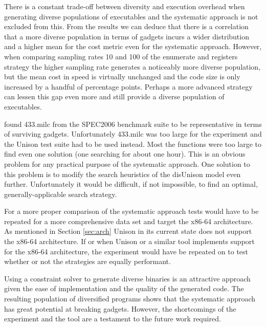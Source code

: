 There is a constant trade-off between diversity and execution overhead when generating
diverse populations of executables and the systematic approach is not excluded from this.
From the results we can deduce that there is a correlation that a more diverse population
in terms of gadgets incurs a wider distribution and a higher mean for the cost metric even
for the systematic approach. However, when comparing sampling rates 10 and 100 of the
enumerate and registers strategy the higher sampling rate generates a noticeably more
diverse population, but the mean cost in speed is virtually unchanged and the code size is
only increased by a handful of percentage points. Perhaps a more advanced strategy can
lessen this gap even more and still provide a diverse population of executables.

\textcite{large-scale-automated} found 433.milc from the SPEC2006 benchmark suite to be
representative in terms of surviving gadgets. Unfortunately 433.milc was too large for the
experiment and the Unison test suite had to be used instead. Most the functions were too
large to find even one solution (one searching for about one hour). This is an obvious
problem for any practical purpose of the systematic approach. One solution to this problem
is to modify the search heuristics of the disUnison model even further. Unfortunately it
would be difficult, if not impossible, to find an optimal, generally-applicable search
strategy.

For a more proper comparison of the systematic approach tests would have to be repeated for
a more comprehensive data set and target the x86-64 architecture. As mentioned in Section
\ref{sec:arch} Unison in its current state does not support the x86-64 architecture. If or
when Unison or a similar tool implements support for the x86-64 architecture, the
experiment would have be repeated on to test whether or not the strategies are equally
performant.

Using a constraint solver to generate diverse binaries is an attractive approach given
the ease of implementation and the quality of the generated code. The resulting population
of diversified programs shows that the systematic approach has great potential at breaking
gadgets. However, the shortcomings of the experiment and the tool are a testament to the
future work required.
